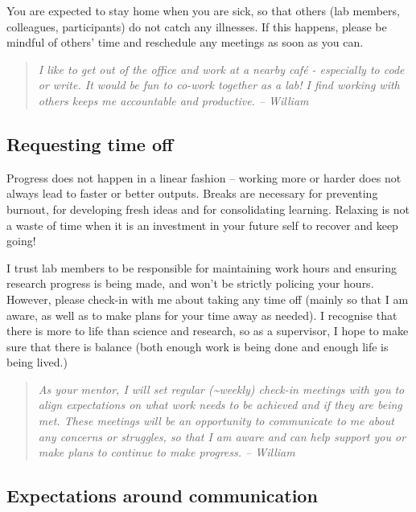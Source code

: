 \documentclass[
]{book}
\begin{document}
You are expected to stay home when you are sick, so that others (lab members, colleagues, participants) do not catch any illnesses. If this happens, please be mindful of others' time and reschedule any meetings as soon as you can.

\begin{quote}
\emph{I like to get out of the office and work at a nearby café - especially to code or write. It would be fun to co-work together as a lab! I find working with others keeps me accountable and productive. -- William}
\end{quote}

\hypertarget{requesting-time-off}{%
\subsection*{Requesting time off}\label{requesting-time-off}}

Progress does not happen in a linear fashion -- working more or harder does not always lead to faster or better outputs. Breaks are necessary for preventing burnout, for developing fresh ideas and for consolidating learning. Relaxing is not a waste of time when it is an investment in your future self to recover and keep going!

I trust lab members to be responsible for maintaining work hours and ensuring research progress is being made, and won't be strictly policing your hours. However, please check-in with me about taking any time off (mainly so that I am aware, as well as to make plans for your time away as needed). I recognise that there is more to life than science and research, so as a supervisor, I hope to make sure that there is balance (both enough work is being done and enough life is being lived.)

\begin{quote}
\emph{As your mentor, I will set regular (\textasciitilde weekly) check-in meetings with you to align expectations on what work needs to be achieved and if they are being met. These meetings will be an opportunity to communicate to me about any concerns or struggles, so that I am aware and can help support you or make plans to continue to make progress. -- William}
\end{quote}

\hypertarget{expectations-around-communication}{%
\subsection{Expectations around communication}\label{expectations-around-communication}}
\end{document}
